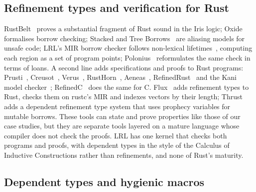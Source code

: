 \subsection{Refinement types and verification for Rust}\label{sec:related:rust}

RustBelt~\cite{jung2018rustbelt} proves a substantial fragment of Rust sound in the Iris logic; Oxide~\cite{weiss2021oxide} formalises borrow checking; Stacked and Tree Borrows~\cite{jung2020stacked,villani2025treeborrows} are aliasing models for unsafe code; LRL's MIR borrow checker follows non-lexical lifetimes~\cite{rfc2094}, computing each region as a set of program points; Polonius~\cite{polonius2018} reformulates the same check in terms of loans.
A second line adds specifications and proofs to Rust programs: Prusti~\cite{astrauskas2019prusti}, Creusot~\cite{denis2022creusot}, Verus~\cite{lattuada2023verus,lattuada2024verussosp}, RustHorn~\cite{matsushita2020rusthorn}, Aeneas~\cite{ho2022aeneas}, RefinedRust~\cite{gaher2024refinedrust} and the Kani model checker~\cite{vanhattum2022kani}; RefinedC~\cite{sammler2021refinedc} does the same for C.
Flux~\cite{lehmann2023flux} adds refinement types to Rust, checks them on rustc's MIR and indexes vectors by their length; Thrust~\cite{ogawa2025thrust} adds a dependent refinement type system that uses prophecy variables for mutable borrows.
These tools can state and prove properties like those of our case studies, but they are separate tools layered on a mature language whose compiler does not check the proofs.
LRL has one kernel that checks both programs and proofs, with dependent types in the style of the Calculus of Inductive Constructions rather than refinements, and none of Rust's maturity.

\subsection{Dependent types and hygienic macros}\label{sec:related:macros}

